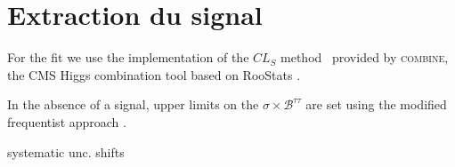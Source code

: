 \section{Extraction du signal}\label{chapter-HTT_analysis-section-signal_extraction}

For the fit we use the implementation of the $CL_S$ method~\cite{CLs_method} provided by \textsc{combine}, the CMS Higgs combination tool based on RooStats \cite{RooStats}.

In the absence of a signal, upper limits on the $\sigma\times\mathcal{B}^{\tau\tau}$ are set using the modified frequentist approach \citep{Junk:1999kv,Read_2002}.

systematic unc. shifts~\cite{BarlowBeeston,BarlowBeeston2}



%



